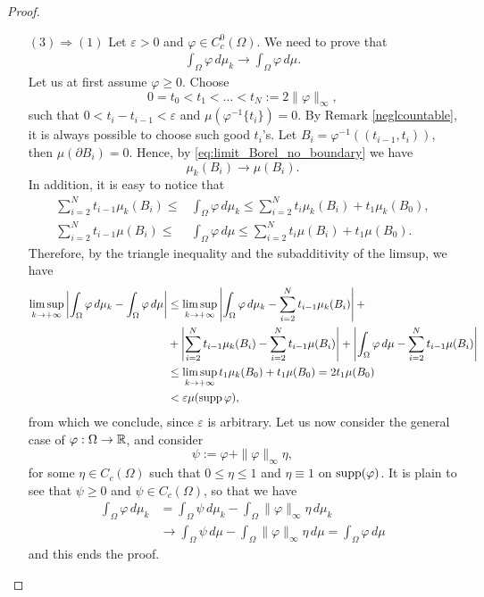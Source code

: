 \begin{proof}
\begin{enumerate}[(1)]
\item[$(3) \Rightarrow (1)$] Let $\varepsilon >0$ and $\varphi \in
C^0_c(\Omega)$. We need to prove that 
\[
\begin{aligned}
\int_\Omega \varphi \, d\mu_k \to \int_\Omega \varphi \, d\mu.
\end{aligned}
\]
Let us at first assume $\varphi \ge 0$. 
Choose $$0 = t_0 < t_1 < \dots < t_N := 2\|\varphi\|_\infty,$$ such that 
$0 < t_i - t_{i-1} < \varepsilon$ and $\mu(\varphi^{-1}\{t_i\}) = 0$. By Remark \ref{neglcountable}, it is always possible to choose such good $t_{i}$'s.
Let $B_i = \varphi^{-1}((t_{i-1},t_i))$, then $\mu(\partial B_i) = 0$. Hence, by \eqref{eq:limit_Borel_no_boundary} we have
\[
\mu_k(B_i) \to \mu(B_i).
\]
In addition, it is easy to notice that
\begin{align*}
\sum_{i=2}^N t_{i-1}\mu_k(B_i) \leq & \int_\Omega \varphi \, d\mu_k \leq \sum_{i=2}^N t_i \mu_k (B_i) +t_1\mu_k(B_0), \\
\sum_{i=2}^N t_{i-1}\mu(B_i) \leq & \int_\Omega \varphi \, d\mu \leq \sum_{i=2}^N t_i \mu(B_i) +t_1\mu(B_0).
\end{align*}
Therefore, by the triangle inequality and the subadditivity of the limsup, we have
\begin{align*}
\limsup_{k \to + \infty} \left|\int_{\Omega} \varphi \, d\mu_{k} - \int_\Omega \varphi \, d\mu\right| & \leq \limsup_{k \to + \infty} \left|\int_{\Omega} \varphi \, d\mu_{k} - \sum_{i=2}^N t_{i-1}\mu_k(B_i) \right | + \\
& + \left | \sum_{i=2}^N t_{i-1}\mu_k(B_i) - \sum_{i=2}^N t_{i-1}\mu (B_i) \right | + \left | \int_{\Omega} \varphi \, d \mu - \sum_{i=2}^N t_{i-1}\mu(B_i) \right | \\
& \le \limsup_{k \to + \infty} t_{1} \mu_{k}(B_{0}) + t_{1} \mu(B_{0}) = 2 t_{1} \mu(B_{0}) \\
& < \varepsilon \mu(\operatorname{supp} \varphi),
\end{align*}
from which we conclude, since $\varepsilon$ is arbitrary. Let us now consider the general case of $\varphi : \Omega\to \mathbb{R}$, and consider $$\psi := \varphi + \|\varphi\|_{\infty} \eta,$$ for some $\eta \in C_{c}(\Omega)$ such that $0 \le \eta \le 1$ and $\eta \equiv 1$ on $\operatorname{supp}(\varphi)$. It is plain to see that $\psi \ge 0$ and $\psi \in C_{c}(\Omega)$, so that we have
\begin{align*}
\int_{\Omega} \varphi \, d \mu_{k} &= \int_{\Omega} \psi \, d \mu_{k} - \int_{\Omega} \|\varphi\|_{\infty} \eta \, d \mu_{k} \\
& \to \int_{\Omega} \psi \, d \mu - \int_{\Omega} \|\varphi\|_{\infty} \eta \, d \mu = \int_{\Omega} \varphi \, d \mu
\end{align*}
and this ends the proof.
\end{enumerate}
\end{proof}


